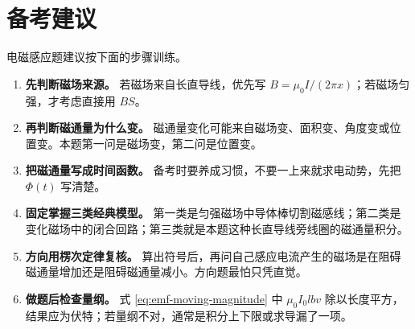 \documentclass[11pt,a4paper,fontset=fandol]{ctexart}
\begin{document}
\section*{备考建议}
\begin{tipBox}
电磁感应题建议按下面的步骤训练。
\begin{enumerate}
 \item \textbf{先判断磁场来源。} 若磁场来自长直导线，优先写 $B=\mu_0 I/(2\pi x)$；若磁场匀强，才考虑直接用 $BS$。
 \item \textbf{再判断磁通量为什么变。} 磁通量变化可能来自磁场变、面积变、角度变或位置变。本题第一问是磁场变，第二问是位置变。
 \item \textbf{把磁通量写成时间函数。} 备考时要养成习惯，不要一上来就求电动势，先把 $\Phi(t)$ 写清楚。
 \item \textbf{固定掌握三类经典模型。} 第一类是匀强磁场中导体棒切割磁感线；第二类是变化磁场中的闭合回路；第三类就是本题这种长直导线旁线圈的磁通量积分。
 \item \textbf{方向用楞次定律复核。} 算出符号后，再问自己感应电流产生的磁场是在阻碍磁通量增加还是阻碍磁通量减小。方向题最怕只凭直觉。
 \item \textbf{做题后检查量纲。} 式 \eqref{eq:emf-moving-magnitude} 中 $\mu_0 I_0 l b v$ 除以长度平方，结果应为伏特；若量纲不对，通常是积分上下限或求导漏了一项。
\end{enumerate}
\end{tipBox}
\end{document}

